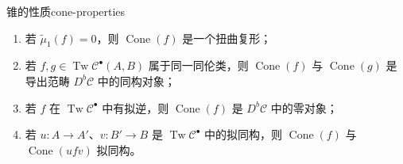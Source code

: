 \begin{lemma}{锥的性质}{cone-properties}
\begin{enumerate}
  \item 若 $\widetilde\mu_1(f)=0$，则 $\operatorname{Cone}(f)$ 是一个扭曲复形；
  \item 若 $f,g\in\operatorname{Tw}\mathcal C^\bullet(A,B)$ 属于同一同伦类，则 $\operatorname{Cone}(f)$ 与 $\operatorname{Cone}(g)$ 是导出范畴 $D^b\mathcal C$ 中的同构对象；
  \item 若 $f$ 在 $\operatorname{Tw}\mathcal C^\bullet$ 中有拟逆，则 $\operatorname{Cone}(f)$ 是 $D^b\mathcal C$ 中的零对象；
  \item 若 $u\colon A\to A'$、$v\colon B'\to B$ 是 $\operatorname{Tw}\mathcal C^\bullet$ 中的拟同构，则 $\operatorname{Cone}(f)$ 与 $\operatorname{Cone}(ufv)$ 拟同构。
\end{enumerate}
\end{lemma}
